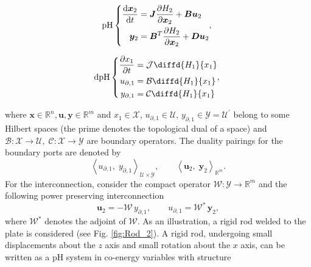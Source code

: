 \documentclass[letterpaper, 10 pt, conference]{ieeeconf}
\begin{document}
\noindent
\begin{minipage}{.5\linewidth}
	\small\begin{equation}
	\text{pH} \left\{ 
	\begin{aligned}
	\diff{\bm{x}_2}{t} &= \bm{J} \diffp{H_2}{\bm{x}_2} + \bm{B} \bm{u}_2 \\
	\bm{y}_{2} &= \bm{B}^T \diffp{H_2}{\bm{x}_2} + \bm{D} \bm{u}_2 \\
	\end{aligned},
	\right. 
	\end{equation}
\end{minipage} %
\begin{minipage}{.45\linewidth}
	\small\begin{equation}
	\text{dpH} \left\{ 
	\begin{aligned}
	\diffp{x_1}{t} &= \mathcal{J} \diffd{H_1}{x_1} \\
	u_{\partial, 1}  &= \mathcal{B} \diffd{H_1}{x_1} \\
	y_{\partial, 1} &= \mathcal{C} \diffd{H_1}{x_1} \\
	\end{aligned},
	\right.
	\end{equation}
\end{minipage}
where $\bm{x} \in \mathbb{R}^n, \bm{u}, \bm{y} \in \mathbb{R}^m$ and $x_1 \in \mathscr{X}$,  $u_{\partial, 1}  \in \mathscr{U}, \, y_{\partial, 1} \in  \mathscr{Y} = \mathscr{U}^\prime$ belong to some Hilbert spaces (the prime denotes the topological dual of a space)  and  $\mathcal{B}: \mathscr{X} \rightarrow \mathscr{U}, \; \mathcal{C}: \mathscr{X} \rightarrow \mathscr{Y}$ are boundary operators. The duality pairings for the boundary ports are denoted by
\[
\left\langle u_{\partial, 1}, \; y_{\partial, 1} \right\rangle_{\mathscr{U} \times \mathscr{Y}},  \qquad
\left\langle \bm{u}_{2}, \; \bm{y}_{2} \right\rangle_{\mathbb{R}^m}.
\]
For the interconnection, consider the compact operator $\mathcal{W}: \mathscr{Y} \rightarrow \mathbb{R}^m$ and the following power preserving interconnection
\begin{equation}
\label{eq:int_inf}
\bm{u}_2 = -\mathcal{W} \, y_{\partial, 1},  \qquad u_{\partial, 1} = \mathcal{W}^* \, \bm{y}_2,
\end{equation}
where $\mathcal{W}^*$ denotes the adjoint of $\mathcal{W}$. As an illustration, a rigid rod welded to the plate is considered  (see Fig. \ref{fig:Rod_2}). A rigid rod, undergoing small displacements about the $z$ axis and small rotation about the $x$ axis, can be written as a pH system in co-energy variables with structure
\end{document}
